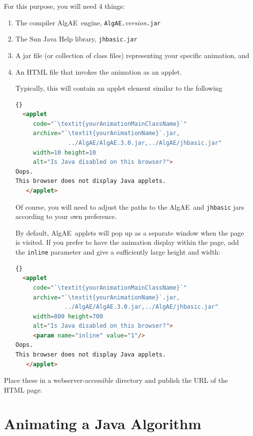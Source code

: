 \documentclass[11pt,titlepage]{book}
\newcommand{\algae}{{\sc AlgAE}}
\begin{document}
For this purpose, you will need 4 things:
\begin{enumerate}
\item The compiler \algae\ engine, \texttt{AlgAE.}\textit{version}\texttt{.jar}
\item The Sun Java Help library, \texttt{jhbasic.jar}
\item A jar file (or collection of class files) representing your specific animation, and
\item An HTML file that invokes the animation as an applet.

Typically, this will contain an applet element similar to the following
\begin{lstlisting}[language=HTML,frame=tb]{}
  <applet
     code="`\textit{yourAnimationMainClassName}`"
     archive="`\textit{yourAnimationName}`.jar,
               ../AlgAE/AlgAE.3.0.jar,../AlgAE/jhbasic.jar"
     width=10 height=10 
     alt="Is Java disabled on this browser?">
Oops.
This browser does not display Java applets.
   </applet>
\end{lstlisting}
Of course, you will need to adjust the paths to the \algae\ and \texttt{jhbasic} jars according to your own preference.

By default, \algae\ applets will pop up as a separate window when the page 
is visited. If you prefer to have the animation display within the page, add the \texttt{inline} parameter and give a sufficiently large height and width:
\begin{lstlisting}[language=HTML,frame=tb]{}
  <applet
     code="`\textit{yourAnimationMainClassName}`"
     archive="`\textit{yourAnimationName}`.jar,
              ../AlgAE/AlgAE.3.0.jar,../AlgAE/jhbasic.jar"
     width=800 height=700 
     alt="Is Java disabled on this browser?">
     <param name="inline" value="1"/>
Oops.
This browser does not display Java applets.
   </applet>
\end{lstlisting}
\end{enumerate}

Place these in a webserver-accessible directory and publish the URL of the HTML page.







\lstset{basicstyle=\small,
        frame=tb,
        escapechar=\`}


\chapter{Animating a Java Algorithm}
\end{document}
